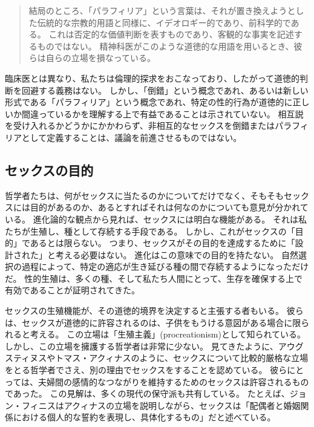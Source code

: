 \documentclass[paper=a4,book,openany]{jlreq}
\begin{document}
\begin{quote}
  結局のところ、「パラフィリア」という言葉は、それが置き換えようとした伝統的な宗教的用語と同様に、イデオロギー的であり、前科学的である。
これは否定的な価値判断を表すものであり、客観的な事実を記述するものではない。
精神科医がこのような道徳的な用語を用いるとき、彼らは自らの立場を損なっている。
\citep{haeberle16:_parap}

\end{quote}

臨床医とは異なり、私たちは倫理的探求をおこなっており、したがって道徳的判断を回避する義務はない。
しかし、「倒錯」という概念であれ、あるいは新しい形式である「パラフィリア」という概念であれ、特定の性的行為が道徳的に正しいか間違っているかを理解する上で有益であることは示されていない。
相互説を受け入れるかどうかにかかわらず、非相互的なセックスを倒錯またはパラフィリアとして定義することは、議論を前進させるものではない。

\subsection{セックスの目的}

哲学者たちは、何がセックスに当たるのかについてだけでなく、そもそもセックスには目的があるのか、あるとすればそれは何なのかについても意見が分かれている。
進化論的な観点から見れば、セックスには明白な機能がある。
それは私たちが生殖し、種として存続する手段である。
しかし、これがセックスの「目的」であるとは限らない。
つまり、セックスがその目的を達成するために「設計された」と考える必要はない。
進化はこの意味での目的を持たない。
自然選択の過程によって、特定の適応が生き延びる種の間で存続するようになっただけだ。
性的生殖は、多くの種、そして私たち人間にとって、生存を確保する上で有効であることが証明されてきた。

セックスの生殖機能が、その道徳的境界を決定すると主張する者もいる。
彼らは、セックスが道徳的に許容されるのは、子供をもうける意図がある場合に限られると考える。
この立場は「生殖主義」(procreationism)として知られている。
しかし、この立場を擁護する哲学者は非常に少ない。
見てきたように、アウグスティヌスやトマス・アクィナスのように、セックスについて比較的厳格な立場をとる哲学者でさえ、別の理由でセックスをすることを認めている。
彼らにとっては、夫婦間の感情的なつながりを維持するためのセックスは許容されるものであった。
この見解は、多くの現代の保守派も共有している。
たとえば、ジョン・フィニスはアクィナスの立場を説明しながら、セックスは「配偶者と婚姻関係における個人的な誓約を表現し、具体化するもの」だと述べている\citep[p.392]{finnis08:_marriag}。
\end{document}
